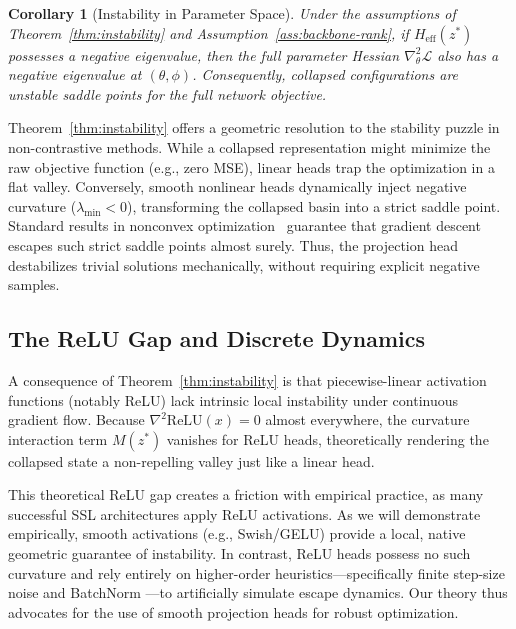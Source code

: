 \documentclass{article}
\theoremstyle{plain}
\newtheorem{corollary}[theorem]{Corollary}
\theoremstyle{definition}
\theoremstyle{remark}
\begin{document}
\begin{corollary}[Instability in Parameter Space]
\label{cor:parameter-instability}
Under the assumptions of Theorem~\ref{thm:instability} and Assumption~\ref{ass:backbone-rank}, if $H_{\text{eff}}(z^*)$ possesses a negative eigenvalue, then the full parameter Hessian $\nabla_\theta^2\mathcal{L}$ also has a negative eigenvalue at $(\theta,\phi)$. Consequently, collapsed configurations are unstable saddle points for the full network objective. 
\end{corollary}

Theorem~\ref{thm:instability} offers a geometric resolution to the stability puzzle in non-contrastive methods. While a collapsed representation might minimize the raw objective function (e.g., zero MSE), linear heads trap the optimization in a flat valley. Conversely, smooth nonlinear heads dynamically inject negative curvature ($\lambda_{\min} < 0$), transforming the collapsed basin into a strict saddle point. Standard results in nonconvex optimization~\citep{lee2016gradient, sagun2018empirical} guarantee that gradient descent escapes such strict saddle points almost surely. Thus, the projection head destabilizes trivial solutions mechanically, without requiring explicit negative samples.

\subsection{The ReLU Gap and Discrete Dynamics}
\label{subsec:relu_gap}

A consequence of Theorem~\ref{thm:instability} is that piecewise-linear activation functions (notably ReLU) lack intrinsic local instability under continuous gradient flow. Because $\nabla^2 \text{ReLU}(x) = 0$ almost everywhere, the curvature interaction term $M(z^*)$ vanishes for ReLU heads, theoretically rendering the collapsed state a non-repelling valley just like a linear head. 

This theoretical ReLU gap creates a friction with empirical practice, as many successful SSL architectures apply ReLU activations. As we will demonstrate empirically, smooth activations (e.g., Swish/GELU) provide a local, native geometric guarantee of instability. In contrast, ReLU heads possess no such curvature and rely entirely on higher-order heuristics---specifically finite step-size noise \citep{cohen2022gradientdescentneuralnetworks} and BatchNorm \citep{santurkar2019how}---to artificially simulate escape dynamics. Our theory thus advocates for the use of smooth projection heads for robust optimization.
\end{document}
